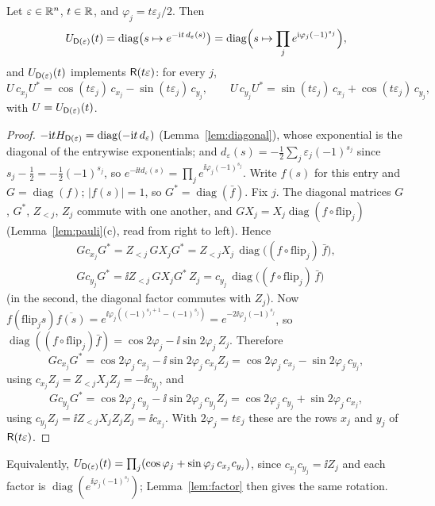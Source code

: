 \begin{lemma}\label{lem:block-evolution}
Let $\varepsilon\in\mathbb R^n$, $t\in\mathbb R$, and $\varphi_j=t\varepsilon_j/2$. Then
\[
 U_{\mathsf D(\varepsilon)}(t)=\operatorname{diag}\bigl(s\mapsto e^{-\mathrm i t\,d_\varepsilon(s)}\bigr)
 =\operatorname{diag}\Bigl(s\mapsto\prod_je^{\mathrm i\varphi_j(-1)^{s_j}}\Bigr),
\]
and $U_{\mathsf D(\varepsilon)}(t)$ implements $\mathsf R(t\varepsilon)$: for every $j$,
\[
 U\,c_{x_j}U^*=\cos(t\varepsilon_j)\,c_{x_j}-\sin(t\varepsilon_j)\,c_{y_j},\qquad
 U\,c_{y_j}U^*=\sin(t\varepsilon_j)\,c_{x_j}+\cos(t\varepsilon_j)\,c_{y_j},
\]
with $U=U_{\mathsf D(\varepsilon)}(t)$.
\end{lemma}
\begin{proof}
$-\mathrm i tH_{\mathsf D(\varepsilon)}=\operatorname{diag}(-\mathrm i t\,d_\varepsilon)$ (Lemma~\ref{lem:diagonal}),
whose exponential is the diagonal of the entrywise exponentials; and
$d_\varepsilon(s)=-\tfrac12\sum_j\varepsilon_j(-1)^{s_j}$ since $s_j-\tfrac12=-\tfrac12(-1)^{s_j}$,
so $e^{-\ii td_\varepsilon(s)}=\prod_je^{\ii\varphi_j(-1)^{s_j}}$.
Write $f(s)$ for this entry and $G=\operatorname{diag}(f)$; $|f(s)|=1$, so
$G^*=\operatorname{diag}(\bar f)$. Fix $j$. The diagonal matrices $G$, $G^*$, $Z_{<j}$, $Z_j$
commute with one another, and $GX_j=X_j\operatorname{diag}(f\circ\mathrm{flip}_j)$
(Lemma~\ref{lem:pauli}(c), read from right to left). Hence
\begin{gather*}
 Gc_{x_j}G^*=Z_{<j}\,GX_jG^*=Z_{<j}X_j\,\operatorname{diag}\bigl((f\circ\mathrm{flip}_j)\,\bar f\bigr),\\
 Gc_{y_j}G^*=\ii Z_{<j}\,GX_jG^*\,Z_j=c_{y_j}\,\operatorname{diag}\bigl((f\circ\mathrm{flip}_j)\,\bar f\bigr)
\end{gather*}
(in the second, the diagonal factor commutes with $Z_j$). Now
$f(\mathrm{flip}_js)\overline{f(s)}=e^{\ii\varphi_j((-1)^{s_j+1}-(-1)^{s_j})}=e^{-2\ii\varphi_j(-1)^{s_j}}$,
so $\operatorname{diag}((f\circ\mathrm{flip}_j)\bar f)=\cos2\varphi_j-\ii\sin2\varphi_j\,Z_j$.
Therefore
\[
 Gc_{x_j}G^*=\cos2\varphi_j\,c_{x_j}-\ii\sin2\varphi_j\,c_{x_j}Z_j
 =\cos2\varphi_j\,c_{x_j}-\sin2\varphi_j\,c_{y_j},
\]
using $c_{x_j}Z_j=Z_{<j}X_jZ_j=-\ii c_{y_j}$, and
\[
 Gc_{y_j}G^*=\cos2\varphi_j\,c_{y_j}-\ii\sin2\varphi_j\,c_{y_j}Z_j
 =\cos2\varphi_j\,c_{y_j}+\sin2\varphi_j\,c_{x_j},
\]
using $c_{y_j}Z_j=\ii Z_{<j}X_jZ_jZ_j=\ii c_{x_j}$. With $2\varphi_j=t\varepsilon_j$ these are the
rows $x_j$ and $y_j$ of $\mathsf R(t\varepsilon)$.
\end{proof}
Equivalently, $U_{\mathsf D(\varepsilon)}(t)=\prod_j(\cos\varphi_j+\sin\varphi_j\,c_{x_j}c_{y_j})$, since
$c_{x_j}c_{y_j}=\ii Z_j$ and each factor is $\operatorname{diag}(e^{\ii\varphi_j(-1)^{s_j}})$;
Lemma~\ref{lem:factor} then gives the same rotation.

